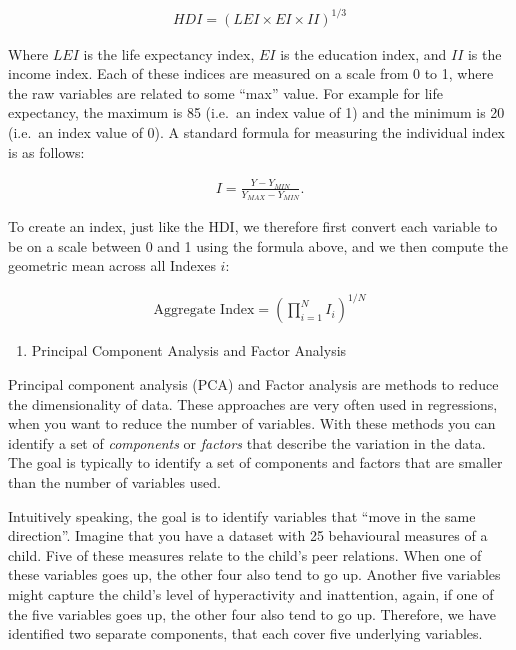 \documentclass[
]{book}
\providecommand{\tightlist}{%
  \setlength{\itemsep}{0pt}\setlength{\parskip}{0pt}}
\begin{document}
\begin{align}
   HDI=(LEI\times EI\times II)^{1/3}
\end{align}

Where \(LEI\) is the life expectancy index, \(EI\) is the education index, and \(II\) is the income index. Each of these indices are measured on a scale from 0 to 1, where the raw variables are related to some ``max'' value. For example for life expectancy, the maximum is 85 (i.e.~an index value of 1) and the minimum is 20 (i.e.~an index value of 0). A standard formula for measuring the individual index is as follows:

\begin{align}
   I=\frac{Y-Y_{MIN}}{Y_{MAX}-Y_{MIN}}.
\end{align}

To create an index, just like the HDI, we therefore first convert each variable to be on a scale between 0 and 1 using the formula above, and we then compute the geometric mean across all Indexes \(i\):

\begin{align}
   \text{Aggregate Index}=\left(\prod_{i=1}^N I_i\right)^{1/N}
\end{align}

\begin{enumerate}
\def\labelenumi{\arabic{enumi}.}
\setcounter{enumi}{1}
\tightlist
\item
  Principal Component Analysis and Factor Analysis
\end{enumerate}

Principal component analysis (PCA) and Factor analysis are methods to reduce the dimensionality of data. These approaches are very often used in regressions, when you want to reduce the number of variables. With these methods you can identify a set of \emph{components} or \emph{factors} that describe the variation in the data. The goal is typically to identify a set of components and factors that are smaller than the number of variables used.

Intuitively speaking, the goal is to identify variables that ``move in the same direction''. Imagine that you have a dataset with 25 behavioural measures of a child. Five of these measures relate to the child's peer relations. When one of these variables goes up, the other four also tend to go up. Another five variables might capture the child's level of hyperactivity and inattention, again, if one of the five variables goes up, the other four also tend to go up. Therefore, we have identified two separate components, that each cover five underlying variables.
\end{document}
